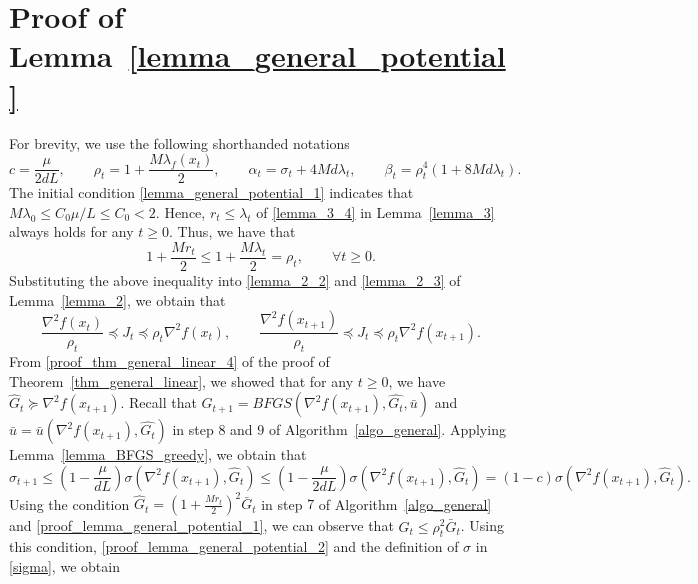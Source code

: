 \documentclass[11pt]{article}
\numberwithin{assumption}{section}
\numberwithin{remark}{section}
\numberwithin{theorem}{section}
\begin{document}
\section{Proof of Lemma~\ref{lemma_general_potential}}\label{sec:proof_of_lemma_general_potential}

For brevity, we use the following shorthanded notations
\begin{equation}
    c = \frac{\mu}{2dL}, \qquad \rho_t = 1 + \frac{M\lambda_{f}(x_t)}{2}, \qquad \alpha_t = \sigma_{t} + 4Md\lambda_t, \qquad \beta_t = \rho_{t}^4 (1 + 8Md\lambda_{t}).
\end{equation}
The initial condition \eqref{lemma_general_potential_1} indicates that $M\lambda_0 \leq C_0\mu/L \leq C_0 < 2$. Hence,  $r_t \leq \lambda_t$ of \eqref{lemma_3_4} in Lemma~\ref{lemma_3} always holds for any $t \geq 0$. Thus, we have that
\begin{equation}\label{proof_lemma_general_potential_1}
    1 + \frac{Mr_t}{2} \leq 1 + \frac{M\lambda_t}{2} = \rho_t, \qquad \forall t \geq 0.
\end{equation}
Substituting the above inequality into \eqref{lemma_2_2} and \eqref{lemma_2_3} of Lemma~\ref{lemma_2}, we obtain that
\begin{equation}\label{proof_lemma_general_potential_2}
     \frac{\nabla^2{f(x_t)}}{\rho_t} \preceq J_t \preceq \rho_t\nabla^2{f(x_t)}, \qquad  \frac{\nabla^2{f(x_{t+1})}}{\rho_t} \preceq J_t \preceq \rho_t\nabla^2{f(x_{t+1})}.
\end{equation}
From \eqref{proof_thm_general_linear_4} of the proof of Theorem~\ref{thm_general_linear}, we showed that for any $t \geq 0$, we have $\hat{G}_t \succeq \nabla^2{f(x_{t + 1})}$. Recall that $G_{t + 1} = BFGS(\nabla^2{f(x_{t + 1})}, \hat{G_t}, \bar{u})$ and $\bar{u} = \bar{u}(\nabla^2{f(x_{t + 1})}, \hat{G_t})$ in step $8$ and $9$ of Algorithm~\ref{algo_general}. Applying Lemma~\ref{lemma_BFGS_greedy}, we obtain that
\begin{equation}\label{proof_lemma_general_potential_3}
\sigma_{t + 1} \leq (1 - \frac{\mu}{dL})\sigma(\nabla^2{f(x_{t + 1})}, \hat{G}_t) \leq (1 - \frac{\mu}{2dL})\sigma(\nabla^2{f(x_{t + 1})}, \hat{G}_t) = (1 - c)\sigma(\nabla^2{f(x_{t + 1})}, \hat{G}_t).
\end{equation}
Using the condition $\hat{G}_t = (1 + \frac{Mr_t}{2})^2\bar{G}_t$ in step $7$ of Algorithm~\ref{algo_general} and \eqref{proof_lemma_general_potential_1}, we can observe that $\hat{G}_t \leq \rho_t^2\bar{G}_t$. Using this condition, \eqref{proof_lemma_general_potential_2} and the definition of $\sigma$ in \eqref{sigma}, we obtain
\end{document}
